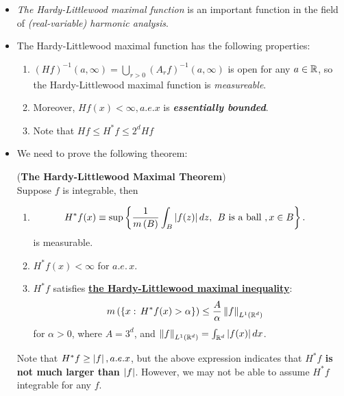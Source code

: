 \documentclass[11pt]{article}
\begin{document}
\begin{itemize}
\item \begin{remark}
\emph{The Hardy-Littlewood maximal function} is an important function in the field of \emph{(real-variable) harmonic analysis}.
\end{remark}

\item \begin{remark} The Hardy-Littlewood maximal function has the following properties:
\begin{enumerate}
\item $(Hf)^{-1}(a, \infty) = \bigcup_{r>0}(A_{r}f)^{-1}(a,\infty)$ is open for any $a\in {\mathbb R}$, so the Hardy-Littlewood maximal function is \emph{measureable}. 
\item  Moreover, $Hf(x)<\infty, a.e. x$ is \emph{\textbf{essentially bounded}}.  
\item Note that $Hf \le H^{*}f \le 2^{d}Hf$
\end{enumerate}
\end{remark}

\item We need to prove the following theorem:
\begin{theorem} \label{thm: hardy_littlewood} (\textbf{The Hardy-Littlewood Maximal Theorem}) \citep{stein2009real, folland2013real}\\
Suppose $f$ is integrable, then 
\begin{enumerate}
\item \begin{align*}
H^{*}f(x) &\equiv \sup\left\{ \frac{1}{m\left(B\right)}\int_{B}\left\lvert f(z) \right\rvert dz, \;\, B\text{ is a ball }, x\in B  \right\}.
\end{align*} is measurable. 

\item $H^{*}f(x) <\infty$ for $a.e.\, x$.

\item  $H^{*}f$ satisfies \underline{\textbf{the Hardy-Littlewood maximal inequality}}:
\begin{align*}
m\left(\left\{x: \, H^{*}f(x)> \alpha\right\}\right) &\le \frac{A}{\alpha}\left\|f\right\|_{L^{1}({\mathbb R}^{d})}
\end{align*}
for $\alpha>0$, where $A= 3^{d}$, and $\left\|f\right\|_{L^{1}({\mathbb R}^{d})}= \int_{{\mathbb R}^{d}}\left\lvert f(x) \right\rvert dx$.
\end{enumerate}
Note that $H^{*}f \ge \left\lvert f \right\rvert, a.e. x$, but the above expression indicates that \textbf{$H^{*}f$ is not much larger than $\left\lvert f \right\rvert$}. However, we may not be able to assume $H^{*}f$ integrable for any $f$.
\end{theorem}


\end{itemize}
\end{document}
